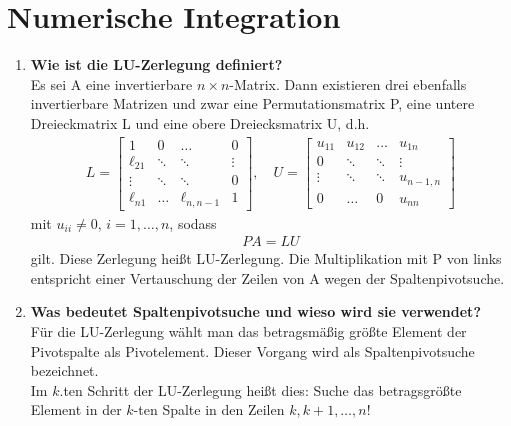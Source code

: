 \section{Numerische Integration}
	\begin{enumerate}
		\item \textbf{Wie ist die LU-Zerlegung definiert?} \\
			Es sei A eine invertierbare \(n\times n\)-Matrix. Dann existieren drei ebenfalls invertierbare Matrizen und zwar eine Permutationsmatrix P, eine untere Dreieckmatrix L und eine obere Dreiecksmatrix U, d.h.
			\begin{align*}
				L = \begin{bmatrix}
					1 & 0 & \dots & 0 \\
					\ell_{21} & \ddots & \ddots & \vdots \\
					\vdots & \ddots & \ddots & 0 \\
					\ell_{n1} & \dots & \ell_{n,n-1} & 1
				\end{bmatrix}, \quad
				U = \begin{bmatrix}
					u_{11} & u_{12} & \dots & u_{1n}\\
					0 & \ddots & \ddots & \vdots \\
					\vdots & \ddots & \ddots & u_{n-1,n} \\
					0 & \dots & 0 & u_{nn}
				\end{bmatrix}
			\end{align*}
			mit \(u_{ii}\neq0,\,i=1,\dots,n\), sodass
			\begin{align*}
				PA=LU
			\end{align*}
			gilt. Diese Zerlegung heißt LU-Zerlegung. Die Multiplikation mit P von links entspricht einer Vertauschung der Zeilen von A wegen der Spaltenpivotsuche.
		
		\item \textbf{Was bedeutet Spaltenpivotsuche und wieso wird sie verwendet?} \\
			Für die LU-Zerlegung wählt man das betragsmäßig größte Element der Pivotspalte als Pivotelement. Dieser Vorgang wird als Spaltenpivotsuche bezeichnet. \\
			Im \(k\).ten Schritt der LU-Zerlegung heißt dies: Suche das betragsgrößte Element in der \(k\)-ten Spalte in den Zeilen \(k,k+1,\dots,n\)!
		

\end{enumerate}
